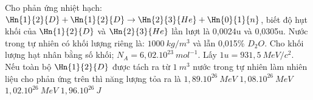 \begin{vidu}%
Cho phản ứng nhiệt hạch: $\Hn{1}{2}{D}+\Hn{1}{2}{D}\to \Hn{2}{3}{He}+\Hn{0}{1}{n}$, biết độ hụt khối của $\Hn{1}{2}{D}$ và $\Hn{2}{3}{He}$ lần lượt là 0,0024u và 0,0305u. Nước trong tự nhiên có khối lượng riêng là: $1000\ kg/m^3$ và lẫn 0,015\% $D_2O$. Cho khối lượng hạt nhân bằng số khối; $N_A=6,02.10^{23}\ mol^{-1}$. Lấy $1u=931,5\ MeV/c^2$. Nếu toàn bộ $\Hn{1}{2}{D}$ được tách ra từ $1\ m^3$ nước trong tự nhiên làm nhiên liệu cho phản ứng trên thì năng lượng tỏa ra là
\motcot
{$1,89.10^{26}\ MeV$}
{\True $1,08.10^{26}\ MeV$}
{$1,02.10^{26}\ MeV$}
{$1,96.10^{26}\ J$}
\end{vidu}
